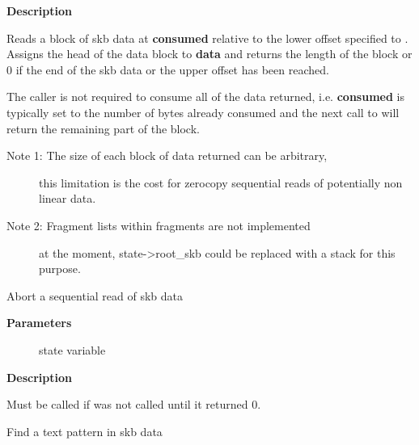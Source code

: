 \documentclass[a4paper,8pt,english]{sphinxmanual}
\begin{document}
\textbf{Description}

Reads a block of skb data at \textbf{consumed} relative to the
lower offset specified to {\hyperref[networking/kapi:c.skb_prepare_seq_read]{\emph{}}}. Assigns
the head of the data block to \textbf{data} and returns the length
of the block or 0 if the end of the skb data or the upper
offset has been reached.

The caller is not required to consume all of the data
returned, i.e. \textbf{consumed} is typically set to the number
of bytes already consumed and the next call to
{\hyperref[networking/kapi:c.skb_seq_read]{\emph{}}} will return the remaining part of the block.
\begin{description}
\item[{Note 1: The size of each block of data returned can be arbitrary,}] \leavevmode
this limitation is the cost for zerocopy sequential
reads of potentially non linear data.

\item[{Note 2: Fragment lists within fragments are not implemented}] \leavevmode
at the moment, state-\textgreater{}root\_skb could be replaced with
a stack for this purpose.

\end{description}

\begin{fulllineitems}
\label{networking/kapi:c.skb_abort_seq_read}
Abort a sequential read of skb data

\end{fulllineitems}


\textbf{Parameters}
\begin{description}
\item[{}] \leavevmode
state variable

\end{description}

\textbf{Description}

Must be called if {\hyperref[networking/kapi:c.skb_seq_read]{\emph{}}} was not called until it
returned 0.

\begin{fulllineitems}
\label{networking/kapi:c.skb_find_text}
Find a text pattern in skb data

\end{fulllineitems}
\end{document}
